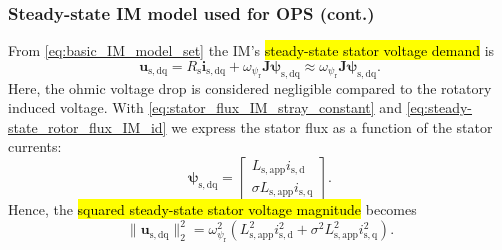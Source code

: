\begin{frame}
    \frametitle{Steady-state IM model used for OPS (cont.)}
    From \eqref{eq:basic_IM_model_set} the IM's \hl{steady-state stator voltage demand} is
    \begin{equation}
        \bm{u}_{\mathrm{s,dq}}= R_\mathrm{s} \bm{i}_\mathrm{s,dq}+ \omega_{\psi_\mathrm{r}}\bm{J}\bm{\psi}_\mathrm{s,dq} \approx \omega_{\psi_\mathrm{r}}\bm{J}\bm{\psi}_\mathrm{s,dq}.
    \end{equation}\pause%
    Here, the ohmic voltage drop is considered negligible compared to the rotatory induced voltage. \pause With \eqref{eq:stator_flux_IM_stray_constant} and \eqref{eq:steady-state_rotor_flux_IM_id} we express the stator flux as a function of the stator currents:
    \begin{equation}
        \bm{\psi}_\mathrm{s,dq} = \begin{bmatrix}
            L_\mathrm{s,app} i_\mathrm{s,d} \\ \sigma L_\mathrm{s,app} i_\mathrm{s,q}
        \end{bmatrix}.
    \end{equation}\pause%
    Hence, the \hl{squared steady-state stator voltage magnitude} becomes
    \begin{equation}
        \|\bm{u}_{\mathrm{s,dq}}\|_2^2
        =\omega_{\psi_\mathrm{r}}^2\left(L_\mathrm{s,app}^2 i_\mathrm{s,d}^2 + \sigma^2 L_\mathrm{s,app}^2 i_\mathrm{s,q}^2\right).
        \label{eq:IM_OPS_voltage_demand}
    \end{equation}
\end{frame}

